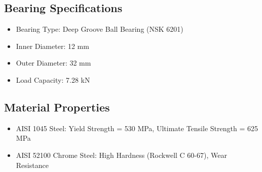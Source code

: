 \documentclass[../../main]{subfiles}
\begin{document}

\subsection*{Bearing Specifications}

\begin{itemize}
\item
  Bearing Type: Deep Groove Ball Bearing (NSK 6201)
\item
  Inner Diameter: 12 mm
\item
  Outer Diameter: 32 mm
\item
  Load Capacity: 7.28 kN
\end{itemize}

\subsection*{Material Properties}

\begin{itemize}
\item
  AISI 1045 Steel: Yield Strength = 530 MPa, Ultimate Tensile Strength =
  625 MPa
\item
  AISI 52100 Chrome Steel: High Hardness (Rockwell C 60-67), Wear
  Resistance
\end{itemize}
\end{document}
